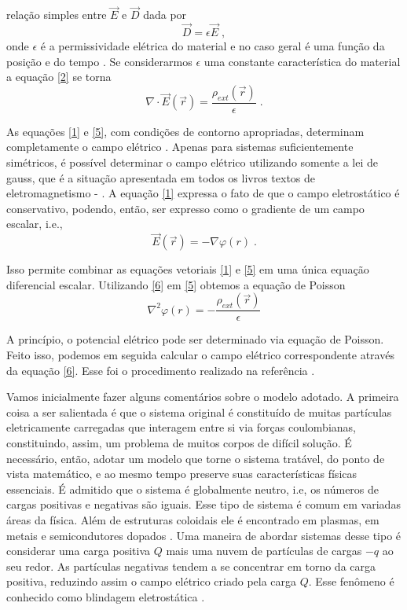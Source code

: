 \documentclass[brazilian,10.7pt,a4paper]{article}
\begin{document}
\begin{multicols}{2}
relação simples entre $\vec{E}$ e $\vec{D}$ dada por
\\
\begin{equation}\label{4}
\vec{D} = \epsilon\vec{E}\;,
\end{equation}
onde $\epsilon$ é a permissividade elétrica do material e no caso geral é uma função da posição e do tempo \cite{andrade}. Se considerarmos $\epsilon$ uma constante característica do material a equação \eqref{2} se torna
\\
\begin{equation}\label{5}
\nabla\cdot\vec{E}(\vec{r})=\frac{\rho_{ext}(\vec{r})}{\epsilon}\;.
\end{equation}
\par As equações \eqref{1} e \eqref{5}, com condições de contorno apropriadas, determinam completamente o campo elétrico \cite{tort}. Apenas para sistemas suficientemente simétricos, é possível determinar o campo elétrico utilizando somente a lei de gauss, que é a situação apresentada em todos os livros textos de eletromagnetismo \cite{hm} - \cite{jackson}. A equação \eqref{1} expressa o fato de que o campo eletrostático é conservativo, podendo, então, ser expresso como o gradiente de um campo escalar, i.e., %
\\
\begin{equation}\label{6}
\vec{E}(\vec{r})= -\nabla\varphi(r)\;.
\end{equation}
\par Isso permite combinar as equações vetoriais \eqref{1} e \eqref{5} em uma única equação diferencial escalar. Utilizando \eqref{6} em \eqref{5} obtemos a equação de Poisson
\\
\begin{equation}\label{7}
\nabla^{2}\varphi(r)=-\frac{\rho_{ext}(\vec{r})}{\epsilon}
\end{equation}
\par A princípio, o potencial elétrico pode ser determinado via equação de Poisson. Feito isso, podemos em seguida calcular o campo elétrico correspondente através da equação \eqref{6}. Esse foi o procedimento realizado na referência \cite{ramos}.
\par Vamos inicialmente fazer alguns comentários sobre o modelo adotado. A primeira coisa a ser salientada é que o sistema original é constituído de muitas partículas eletricamente carregadas que interagem entre si via forças coulombianas, constituindo, assim, um problema de muitos corpos de difícil solução. É necessário, então, adotar um modelo que torne o sistema tratável, do ponto de vista matemático, e ao mesmo tempo preserve suas características físicas essenciais. É admitido que o sistema é globalmente neutro, i.e, os números de cargas positivas e negativas são iguais. Esse tipo de sistema é comum em variadas áreas da física. Além de estruturas coloidais ele é encontrado em plasmas, em metais e semicondutores dopados \cite{platzman}. Uma maneira de abordar sistemas desse tipo é considerar uma carga positiva $Q$ mais uma nuvem de partículas de cargas $-q$ ao seu redor. As partículas negativas tendem a se concentrar em torno da carga positiva, reduzindo assim o campo elétrico criado pela carga $Q$. Esse fenômeno é conhecido como blindagem eletrostática \cite{kittel}.

\end{multicols}
\end{document}
